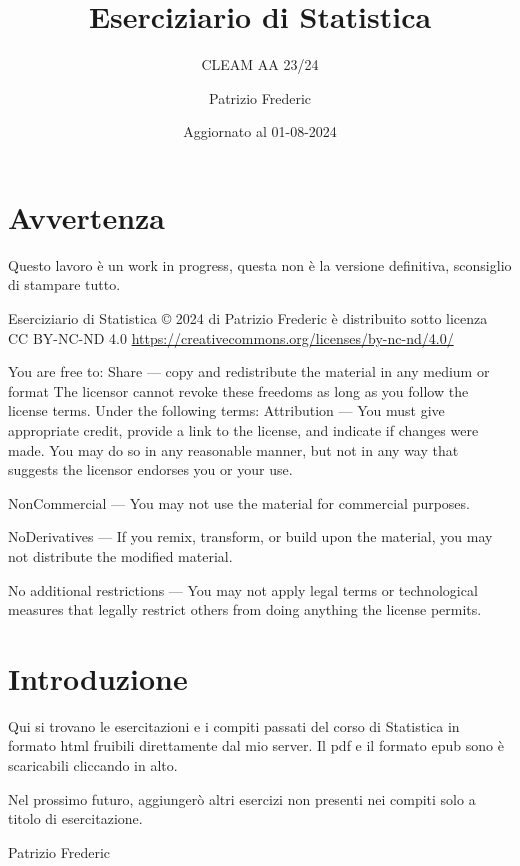 \documentclass[
  11pt,
]{book}
\title{Eserciziario di Statistica}
\subtitle{CLEAM AA 23/24}
\author{Patrizio Frederic}
\date{Aggiornato al 01-08-2024}
\theoremstyle{mytheoremstyle}
\theoremstyle{mydefstyle}
\begin{document}
\maketitle

{
\setcounter{tocdepth}{5}
\tableofcontents
}
\chapter*{Avvertenza}\label{avvertenza}

\large

Questo lavoro è un work in progress, questa non è la versione definitiva, sconsiglio di stampare tutto.

\normalsize

Eserciziario di Statistica © 2024 di Patrizio Frederic è distribuito
sotto licenza CC BY-NC-ND 4.0
\url{https://creativecommons.org/licenses/by-nc-nd/4.0/}

You are free to:
Share --- copy and redistribute the material in any medium or format
The licensor cannot revoke these freedoms as long as you follow the license terms.
Under the following terms:
Attribution --- You must give appropriate credit, provide a link to the license, and indicate if changes were made. You may do so in any reasonable manner, but not in any way that suggests the licensor endorses you or your use.

NonCommercial --- You may not use the material for commercial purposes.

NoDerivatives --- If you remix, transform, or build upon the material, you may not distribute the modified material.

No additional restrictions --- You may not apply legal terms or technological measures that legally restrict others from doing anything the license permits.

\chapter*{Introduzione}\label{introduzione}

Qui si trovano le esercitazioni e i compiti passati del corso di Statistica
in formato html fruibili direttamente dal mio server.
Il pdf e il formato epub sono è scaricabili cliccando in alto.

Nel prossimo futuro, aggiungerò altri esercizi non presenti nei compiti solo a titolo
di esercitazione.

Patrizio Frederic
\end{document}
